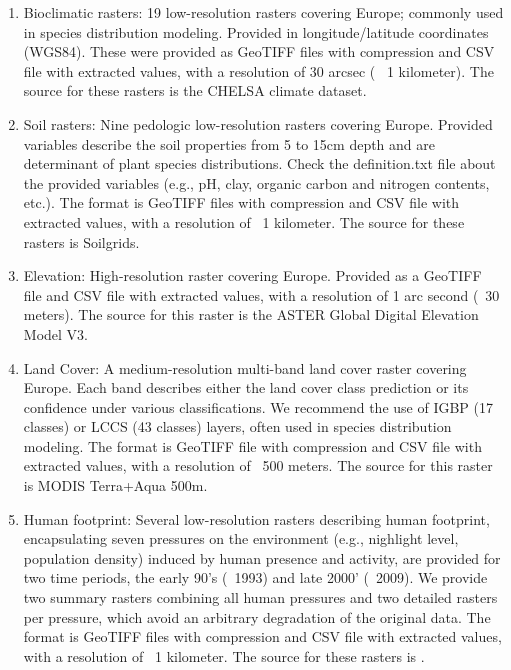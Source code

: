 \begin{enumerate}
    \item Bioclimatic rasters: 19 low-resolution rasters covering Europe; commonly used in species distribution modeling. Provided in longitude/latitude coordinates (WGS84). These were provided as GeoTIFF files with compression and CSV file with extracted values, with a resolution of 30 arcsec (~ 1 kilometer). The source for these rasters is the CHELSA climate dataset.
    \item Soil rasters: Nine pedologic low-resolution rasters covering Europe. Provided variables describe the soil properties from 5 to 15cm depth and are determinant of plant species distributions. Check the definition.txt file about the provided variables (e.g., pH, clay, organic carbon and nitrogen contents, etc.). The format is GeoTIFF files with compression and CSV file with extracted values, with a resolution of ~1 kilometer. The source for these rasters is Soilgrids.
    \item Elevation: High-resolution raster covering Europe. Provided as a GeoTIFF file and CSV file with extracted values, with a resolution of 1 arc second (~30 meters). The source for this raster is the ASTER Global Digital Elevation Model V3.
    \item Land Cover: A medium-resolution multi-band land cover raster covering Europe. Each band describes either the land cover class prediction or its confidence under various classifications. We recommend the use of IGBP (17 classes) or LCCS (43 classes) layers, often used in species distribution modeling. The format is GeoTIFF file with compression and CSV file with extracted values, with a resolution of ~500 meters. The source for this raster is MODIS Terra+Aqua 500m.
    \item Human footprint: Several low-resolution rasters describing human footprint, encapsulating seven pressures on the environment (e.g., nighlight level, population density) induced by human presence and activity, are provided for two time periods, the early 90's (~1993) and late 2000' (~2009). We provide two summary rasters combining all human pressures and two detailed rasters per pressure, which avoid an arbitrary degradation of the original data. The format is GeoTIFF files with compression and CSV file with extracted values, with a resolution of ~1 kilometer. The source for these rasters is \cite{human-footprint-dataset-2016}.
\end{enumerate}
